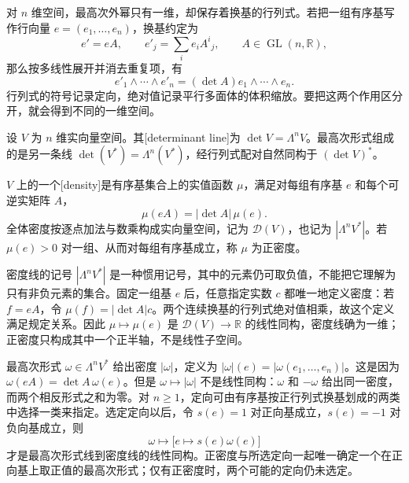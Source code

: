 对 \(n\) 维空间，最高次外幂只有一维，却保存着换基的行列式。若把一组有序基写作行向量 \(e=(e_1,\ldots,e_n)\)，换基约定为
\[
	e'=eA,\qquad e'_j=\sum_i e_i A^i{}_j,\qquad A\in\operatorname{GL}(n,\mathbb R),
\]
那么按多线性展开并消去重复项，有
\[
	e'_1\wedge\cdots\wedge e'_n=(\det A)e_1\wedge\cdots\wedge e_n.
\]
行列式的符号记录定向，绝对值记录平行多面体的体积缩放。要把这两个作用区分开，就会得到不同的一维空间。

\begin{definition}
	\label{g1:def:determinant-density-line}
	设 \(V\) 为 \(n\) 维实向量空间。其[determinant line]为 \(\det V=\Lambda^nV\)。最高次形式组成的是另一条线 \(\det(V^*)=\Lambda^n(V^*)\)，经行列式配对自然同构于 \((\det V)^*\)。

	\(V\) 上的一个[density]是有序基集合上的实值函数 \(\mu\)，满足对每组有序基 \(e\) 和每个可逆实矩阵 \(A\)，
	\[
		\mu(eA)=|\det A|\,\mu(e).
	\]
	全体密度按逐点加法与数乘构成实向量空间，记为 \(\mathcal D(V)\)，也记为 \(|\Lambda^nV^*|\)。若 \(\mu(e)>0\) 对一组、从而对每组有序基成立，称 \(\mu\) 为正密度。
\end{definition}

密度线的记号 \(|\Lambda^nV^*|\) 是一种惯用记号，其中的元素仍可取负值，不能把它理解为只有非负元素的集合。固定一组基 \(e\) 后，任意指定实数 \(c\) 都唯一地定义密度：若 \(f=eA\)，令 \(\mu(f)=|\det A|c\)。两个连续换基的行列式绝对值相乘，故这个定义满足规定关系。因此 \(\mu\mapsto\mu(e)\) 是 \(\mathcal D(V)\to\mathbb R\) 的线性同构，密度线确为一维；正密度只构成其中一个正半轴，不是线性子空间。

\ProseParagraphBreak

最高次形式 \(\omega\in\Lambda^nV^*\) 给出密度 \(|\omega|\)，定义为 \(|\omega|(e)=|\omega(e_1,\ldots,e_n)|\)。这是因为 \(\omega(eA)=\det A\,\omega(e)\)。但是 \(\omega\mapsto|\omega|\) 不是线性同构：\(\omega\) 和 \(-\omega\) 给出同一密度，而两个相反形式之和为零。对 \(n\ge1\)，定向可由有序基按正行列式换基划成的两类中选择一类来指定。选定定向以后，令 \(s(e)=1\) 对正向基成立，\(s(e)=-1\) 对负向基成立，则
\[
	\omega\longmapsto\bigl[e\longmapsto s(e)\omega(e)\bigr]
\]
才是最高次形式线到密度线的线性同构。正密度与所选定向一起唯一确定一个在正向基上取正值的最高次形式；仅有正密度时，两个可能的定向仍未选定。

\ProseParagraphBreak

